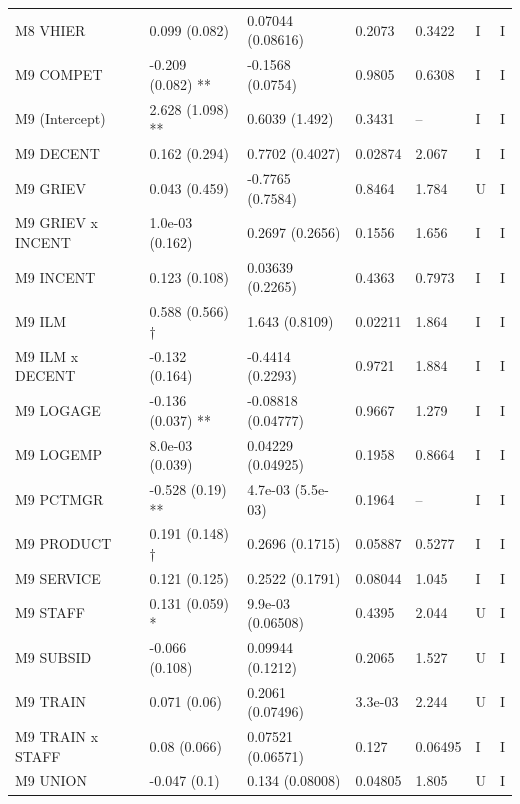 {\begin{longtable}{@{}p{.245\linewidth}p{.17\linewidth}p{.17\linewidth}p{.085\linewidth}p{.060\linewidth}p{.08\linewidth}p{.07\linewidth}@{}}
M8 VHIER & 0.099 (0.082) & 0.07044 (0.08616) & 0.2073 & 0.3422 & I & I\\
M9 COMPET & -0.209 (0.082) ** & -0.1568 (0.0754) & 0.9805 & 0.6308 & I & I\\
M9 (Intercept) & 2.628 (1.098) ** & 0.6039 (1.492) & 0.3431 & -- & I & I\\
M9 DECENT & 0.162 (0.294) & 0.7702 (0.4027) & 0.02874 & 2.067 & I & I\\
M9 GRIEV & 0.043 (0.459) & -0.7765 (0.7584) & 0.8464 & 1.784 & U & I\\
M9 GRIEV x INCENT & 1.0e-03 (0.162) & 0.2697 (0.2656) & 0.1556 & 1.656 & I & I\\
M9 INCENT & 0.123 (0.108) & 0.03639 (0.2265) & 0.4363 & 0.7973 & I & I\\
M9 ILM & 0.588 (0.566) † & 1.643 (0.8109) & 0.02211 & 1.864 & I & I\\
M9 ILM x DECENT & -0.132 (0.164) & -0.4414 (0.2293) & 0.9721 & 1.884 & I & I\\
M9 LOGAGE & -0.136 (0.037) ** & -0.08818 (0.04777) & 0.9667 & 1.279 & I & I\\
M9 LOGEMP & 8.0e-03 (0.039) & 0.04229 (0.04925) & 0.1958 & 0.8664 & I & I\\
M9 PCTMGR & -0.528 (0.19) ** & 4.7e-03 (5.5e-03) & 0.1964 & -- & I & I\\
M9 PRODUCT & 0.191 (0.148) † & 0.2696 (0.1715) & 0.05887 & 0.5277 & I & I\\
M9 SERVICE & 0.121 (0.125) & 0.2522 (0.1791) & 0.08044 & 1.045 & I & I\\
M9 STAFF & 0.131 (0.059) * & 9.9e-03 (0.06508) & 0.4395 & 2.044 & U & I\\
M9 SUBSID & -0.066 (0.108) & 0.09944 (0.1212) & 0.2065 & 1.527 & U & I\\
M9 TRAIN & 0.071 (0.06) & 0.2061 (0.07496) & 3.3e-03 & 2.244 & U & I\\
M9 TRAIN x STAFF & 0.08 (0.066) & 0.07521 (0.06571) & 0.127 & 0.06495 & I & I\\
M9 UNION & -0.047 (0.1) & 0.134 (0.08008) & 0.04805 & 1.805 & U & I\\
\end{longtable}}
